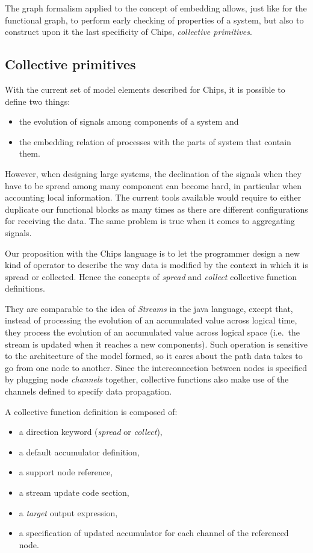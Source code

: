 \documentclass[runningheads]{llncs}
\begin{document}
The graph formalism applied to the concept of embedding allows, just like for the functional graph, to perform early checking of properties of a system, but also to construct upon it the last specificity of Chips, \emph{collective primitives}.

\subsection{Collective primitives}

With the current set of model elements described for Chips, it is possible to define two things:
\begin{itemize}
    \item the evolution of signals among components of a system and
    \item the embedding relation of processes with the parts of system that contain them.
\end{itemize}

However, when designing large systems, the declination of the signals when they have to be spread among many component can become hard, in particular when accounting local information. The current tools available would require to either duplicate our functional blocks as many times as there are different configurations for receiving the data. The same problem is true when it comes to aggregating signals.

Our proposition with the Chips language is to let the programmer design a new kind of operator to describe the way data is modified by the context in which it is spread or collected. Hence the concepts of \emph{spread} and \emph{collect} collective function definitions.

They are comparable to the idea of \emph{Streams} in the java language, except that, instead of processing the evolution of an accumulated value across logical time, they process the evolution of an accumulated value across logical space (i.e.~the stream is updated when it reaches a new components). Such operation is sensitive to the architecture of the model formed, so it cares about the path data takes to go from one node to another. Since the interconnection between nodes is specified by plugging node \emph{channels} together, collective functions also make use of the channels defined to specify data propagation.

A collective function definition is composed of:
\begin{itemize}
    \item a direction keyword (\emph{spread} or \emph{collect}),
    \item a default accumulator definition,
    \item a support node reference,
    \item a stream update code section,
    \item a \emph{target} output expression,
    \item a specification of updated accumulator for each channel of the referenced node.
\end{itemize}
\end{document}

